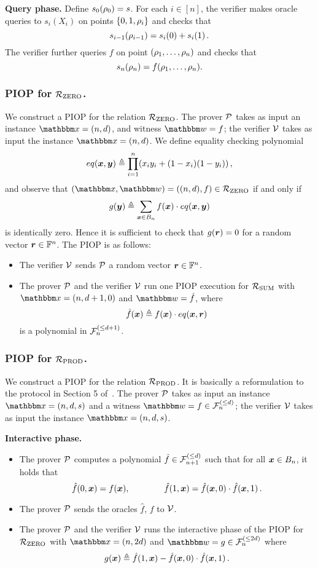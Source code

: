 \textbf{Query phase.}
Define $s_0(\rho_{0}) = s$. For each $i \in [n]$, the verifier makes oracle queries to $s_i(X_i)$ on points
$\{0, 1, \rho_{i} \}$ and checks that
\[
  s_{i-1}(\rho_{i-1}) = s_{i}(0) + s_{i}(1) \,.  
\]
The verifier further queries $f$ on point $(\rho_{1}, \dots, \rho_{n})$ and checks that
\[
  s_n(\rho_{n}) = f(\rho_{1}, \dots, \rho_{n}).  
\]

\subsubsection*{PIOP for ${\mathcal{R}}_{\text{ZERO}}$.} 
We construct a PIOP for the relation ${\mathcal{R}}_{\text{ZERO}}$.
The prover $\mathcal{P}$ takes as input an instance $\instR = (n, d)$,
and witness $\witR = f$; the verifier $\mathcal{V}$ takes as input the 
instance $\instR = (n, d)$. We define equality checking polynomial
\[
  eq(\boldsymbol{x}, \boldsymbol{y}) \mathrel{\triangleq} \prod_{i=1}^{n} (x_iy_i + (1-x_i)(1-y_i)) \,,
\]
and observe that $(\instR, \witR) = ((n,d), f) \in \RZERO$ if and only if
\[
  g(\boldsymbol{y}) \mathrel{\triangleq} \sum_{\boldsymbol{x} \in B_{n}} f(\boldsymbol{x}) \cdot eq(\boldsymbol{x}, \boldsymbol{y})  
\]
is identically zero. Hence it is sufficient to check that $g(\boldsymbol{r}) = 0$
for a random vector $\boldsymbol{r} \in \mathbb{F}^n$. The PIOP is as follows:
\begin{itemize}
    \item The verifier $\mathcal{V}$ sends $\mathcal{P}$ a random vector $\boldsymbol{r} \in \mathbb{F}^{n}$.
    \item The prover $\mathcal{P}$ and the verifier $\mathcal{V}$ run one PIOP execution
    for ${\mathcal{R}}_{\text{SUM}}$ with $\instR = (n, d+1, 0)$ and $\witR = \hat{f}$, where
    \[
      \hat{f}(\boldsymbol{x}) \mathrel{\triangleq} f(\boldsymbol{x}) \cdot eq(\boldsymbol{x}, \boldsymbol{r}) 
    \]
    is a polynomial in ${\mathcal{F}}_{n}^{(\le{d+1})}$.
\end{itemize}

\subsubsection*{PIOP for ${\mathcal{R}}_{\text{PROD}}$.}
We construct a PIOP for the relation ${\mathcal{R}}_{\text{PROD}}$.
It is basically a reformulation to the protocol in Section 5
of~\cite{SL20}.
The prover $\mathcal{P}$ takes as input an instance $\instR = (n, d, s)$
and a witness $\witR = f \in \bdp{n}{d}$; the verifier $\mathcal{V}$
takes as input the instance $\instR = (n, d, s)$.

\textbf{Interactive phase.} 
\begin{itemize}
    \item The prover $\mathcal{P}$ computes a polynomial $\hat{f} \in {\mathcal{F}}_{n+1}^{(\le{d})}$ such that 
    for all $\boldsymbol{x} \in B_{n}$, it holds that
    \[
      \hat{f}(0, \boldsymbol{x}) = f(\boldsymbol{x}), \qquad \qquad \hat{f}(1, \boldsymbol{x}) = \hat{f}(\boldsymbol{x}, 0) \cdot \hat{f}(\boldsymbol{x}, 1)\,.
    \]
    \item The prover $\mathcal{P}$ sends the oracles $\hat{f}$, $f$ to $\mathcal{V}$.
    \item The prover $\mathcal{P}$ and the verifier $\mathcal{V}$ runs the interactive phase of 
        the PIOP for ${\mathcal{R}}_{\text{ZERO}}$ with $\instR = (n, 2d)$ and $\witR = g \in \bdp{n}{2d}$ where
        \[
            g(\boldsymbol{x}) \mathrel{\triangleq} \hat{f}(1, \boldsymbol{x}) - \hat{f}(\boldsymbol{x}, 0) \cdot \hat{f}(\boldsymbol{x}, 1) \,.
        \]
\end{itemize}

